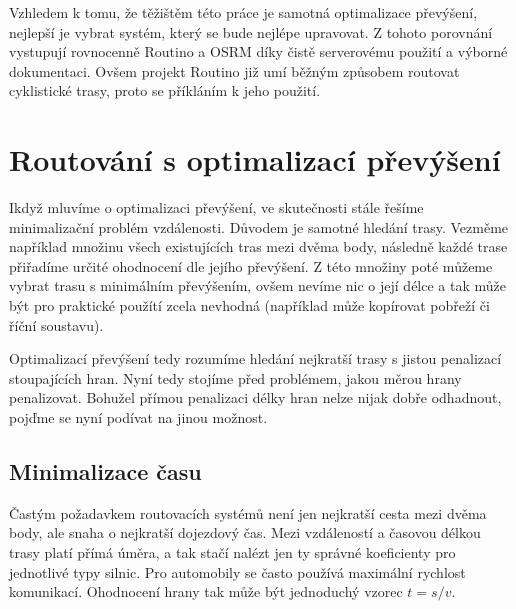 \documentclass[thesis=B,czech]{FITthesis}[2012/06/26]
\begin{document}
Vzhledem k tomu, že těžištěm této práce je samotná optimalizace převýšení, nejlepší je vybrat systém, který se bude nejlépe upravovat. Z tohoto porovnání vystupují rovnocenně Routino a OSRM díky čistě serverovému použití a výborné dokumentaci. Ovšem projekt Routino již umí běžným způsobem routovat cyklistické trasy, proto se příkláním k jeho použití.




























\chapter{Routování s optimalizací převýšení}

Ikdyž mluvíme o optimalizaci převýšení, ve skutečnosti stále řešíme minimalizační problém vzdálenosti. Důvodem je samotné hledání trasy. Vezměme například množinu všech existujících tras mezi dvěma body, následně každé trase přiřadíme určité ohodnocení dle jejího převýšení. Z této množiny poté můžeme vybrat trasu s minimálním převýšením, ovšem nevíme nic o její délce a tak může být pro praktické použítí zcela nevhodná (například může kopírovat pobřeží či říční soustavu).

Optimalizací převýšení tedy rozumíme hledání nejkratší trasy s jistou penalizací stoupajících hran. Nyní tedy stojíme před problémem, jakou měrou hrany penalizovat. Bohužel přímou penalizaci délky hran nelze nijak dobře odhadnout, pojďme se nyní podívat na jinou možnost.

\section{Minimalizace času} \label{minimalizace-casu}
Častým požadavkem routovacích systémů není jen nejkratší cesta mezi dvěma body, ale snaha o nejkratší dojezdový čas. Mezi vzdáleností a časovou délkou trasy platí přímá úměra, a tak stačí nalézt jen ty správné koeficienty pro jednotlivé typy silnic. Pro automobily se často používá maximální rychlost komunikací. Ohodnocení hrany tak může být jednoduchý vzorec $t=s / v$. 
\end{document}
